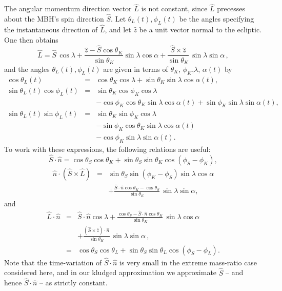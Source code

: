 \documentclass[12pt]{iopart}
\def\be{\begin{equation}}
\def\ee{\end{equation}}
\def\bea{\begin{eqnarray}}
\def\eea{\end{eqnarray}}
\begin{document}
The angular momentum direction vector $\hat L$ is not constant, since $\hat L$ precesses about the MBH's spin
direction $\hat S$.  Let $\theta_L(t),\phi_L(t)$ be the angles specifying the instantaneous direction of $\hat L$, and let $\hat z$ be a unit vector normal to the ecliptic. One then obtains
\be \label{alpha}
\hat L = \hat S \, \cos\lambda +
\frac{\hat z - \hat S \cos\theta_K}{\sin\theta_K} \sin\lambda \cos\alpha
+ \frac{\hat S \times \hat z}{\sin\theta_K}  \, \sin\lambda \sin\alpha\,,
\ee
\noindent
and the angles $\theta_L(t),\phi_L(t)$ are given in terms of $\theta_K$, $\phi_K$,$\lambda$, $\alpha(t)$ by
\begin{eqnarray}\label{relations3}
\cos\theta_L(t) &=& \cos\theta_K \cos\lambda
    +\sin\theta_K\sin\lambda\cos\alpha(t), \nonumber\\
\sin\theta_L(t)\cos\phi_L(t) &=&
\sin\theta_K\cos\phi_K\cos\lambda \nonumber \\
& & -\cos\phi_K\cos\theta_K\sin\lambda\cos\alpha(t)
+\sin\phi_K\sin\lambda\sin\alpha(t),  \nonumber\\
\sin\theta_L(t)\sin\phi_L(t) &=&
\sin\theta_K\sin\phi_K\cos\lambda \nonumber \\
& & -\sin\phi_K\cos\theta_K\sin\lambda\cos\alpha(t) \nonumber \\
& & -\cos\phi_K\sin\lambda\sin\alpha(t).
\end{eqnarray}
%
To work with these expressions, the following relations are useful:
\be
\label{SdotN}
{ \hat S}\cdot{ \hat n} = \cos\theta_S \cos\theta_K
+ \sin\theta_S \sin\theta_K \cos(\phi_S-\phi_K),
\ee
\bea\label{ScrossLdotN}
\hat n \cdot (\hat S \times \hat L) & = &
\sin\theta_S \sin(\phi_K-\phi_S)\sin\lambda \cos\alpha \nonumber \\
& &+ \frac{\hat S\cdot\hat n \cos\theta_K -\cos\theta_S}{\sin\theta_K}
\, \sin\lambda \sin\alpha,
\eea
and
\bea
\label{LdotN}
{ \hat L}\cdot{ \hat n} & = & { \hat S}\cdot{ \hat n}\cos\lambda
+ \frac{\cos\theta_S - \hat S\cdot\hat n \cos\theta_K}{\sin\theta_K}
\, \sin\lambda \cos\alpha \nonumber \\
& & + \frac{(\hat S \times \bar z)\cdot \hat n}
{\sin\theta_K}  \, \sin\lambda \sin\alpha\,, \nonumber \\
& = & \cos\theta_S \cos\theta_L +
\sin\theta_S \sin\theta_L \cos(\phi_S-\phi_L).
\eea
Note that the time-variation of ${ \hat S}\cdot{ \hat n}$ is very small in the extreme mass-ratio case considered here, and in our kludged approximation we approximate $\hat S$ -- and hence ${\hat S}\cdot{\hat n}$ -- as strictly constant.
\end{document}
